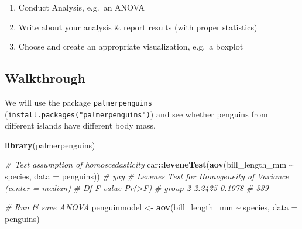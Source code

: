 \documentclass[
]{book}
\newenvironment{Shaded}{\begin{snugshade}}{\end{snugshade}}
\newcommand{\AttributeTok}[1]{\textcolor[rgb]{0.13,0.29,0.53}{#1}}
\newcommand{\CommentTok}[1]{\textcolor[rgb]{0.56,0.35,0.01}{\textit{#1}}}
\newcommand{\FunctionTok}[1]{\textcolor[rgb]{0.13,0.29,0.53}{\textbf{#1}}}
\newcommand{\NormalTok}[1]{#1}
\newcommand{\OtherTok}[1]{\textcolor[rgb]{0.56,0.35,0.01}{#1}}
\newcommand{\SpecialCharTok}[1]{\textcolor[rgb]{0.81,0.36,0.00}{\textbf{#1}}}
\providecommand{\tightlist}{%
  \setlength{\itemsep}{0pt}\setlength{\parskip}{0pt}}
\begin{document}
\begin{enumerate}
\def\labelenumi{\arabic{enumi}.}
\tightlist
\item
  Conduct Analysis, e.g.~an ANOVA
\item
  Write about your analysis \& report results (with proper statistics)
\item
  Choose and create an appropriate visualization, e.g.~a boxplot
\end{enumerate}

\subsection{Walkthrough}\label{walkthrough}

We will use the package \texttt{palmerpenguins} (\texttt{install.packages("palmerpenguins")}) and see whether penguins from different islands have different body mass.

\begin{Shaded}
\begin{Highlighting}[]
\FunctionTok{library}\NormalTok{(palmerpenguins)}

\CommentTok{\# Test assumption of homoscedasticity}
\NormalTok{car}\SpecialCharTok{::}\FunctionTok{leveneTest}\NormalTok{(}\FunctionTok{aov}\NormalTok{(bill\_length\_mm }\SpecialCharTok{\textasciitilde{}}\NormalTok{ species, }\AttributeTok{data =}\NormalTok{ penguins)) }\CommentTok{\# yay}
\CommentTok{\# Levene\textquotesingle{}s Test for Homogeneity of Variance (center = median)}
\CommentTok{\#        Df F value Pr(\textgreater{}F)}
\CommentTok{\# group   2  2.2425 0.1078}
\CommentTok{\#       339}
\end{Highlighting}
\end{Shaded}

\begin{Shaded}
\begin{Highlighting}[]
\CommentTok{\# Run \& save ANOVA}
\NormalTok{penguinmodel }\OtherTok{\textless{}{-}} \FunctionTok{aov}\NormalTok{(bill\_length\_mm }\SpecialCharTok{\textasciitilde{}}\NormalTok{ species, }\AttributeTok{data =}\NormalTok{ penguins)}
\end{Highlighting}
\end{Shaded}

\begin{Shaded}
\end{Shaded}
\end{document}

